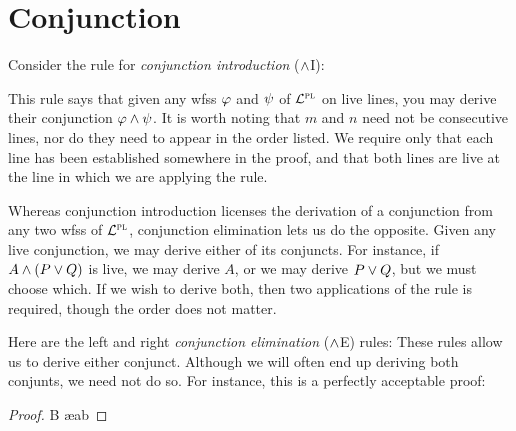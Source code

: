 \section{Conjunction}

Consider the rule for \textit{conjunction introduction} ($\wedge$I):


This rule says that given any wfss $\varphi$ and $\psi$ of $\mathcal{L}^{\textsc{pl}}$ on live lines, you may derive their conjunction $\varphi \wedge \psi$.
It is worth noting that $m$ and $n$ need not be consecutive lines, nor do they need to appear in the order listed.
We require only that each line has been established somewhere in the proof, and that both lines are live at the line in which we are applying the rule.

Whereas conjunction introduction licenses the derivation of a conjunction from any two wfss of $\mathcal{L}^{\textsc{pl}}$, conjunction elimination lets us do the opposite.
Given any live conjunction, we may derive either of its conjuncts.
For instance, if $A \wedge (P \vee Q)$ is live, we may derive $A$, or we may derive $P \vee Q$, but we must choose which.
If we wish to derive both, then two applications of the rule is required, though the order does not matter.

Here are the left and right \textit{conjunction elimination} ($\wedge$E) rules:
These rules allow us to derive either conjunct.
Although we will often end up deriving both conjunts, we need not do so.
For instance, this is a perfectly acceptable proof:

\begin{proof}
	 \pr{}
	B \ae{ab}
\end{proof}

